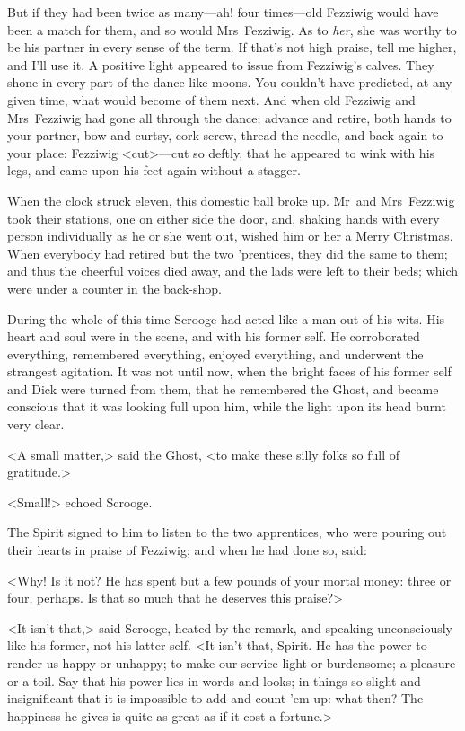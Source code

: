 But if they had been twice as many—ah! four times—old Fezziwig would have been a match for them, and so would Mrs~Fezziwig. As to \textit{her}, she was worthy to be his partner in every sense of the term. If that's not high praise, tell me higher, and I'll use it. A positive light appeared to issue from Fezziwig's calves. They shone in every part of the dance like moons. You couldn't have predicted, at any given time, what would become of them next. And when old Fezziwig and Mrs~Fezziwig had gone all through the dance; advance and retire, both hands to your partner, bow and curtsy, cork-screw, thread-the-needle, and back again to your place: Fezziwig <cut>—cut so deftly, that he appeared to wink with his legs, and came upon his feet again without a stagger.

When the clock struck eleven, this domestic ball broke up. Mr~and Mrs~Fezziwig took their stations, one on either side the door, and, shaking hands with every person individually as he or she went out, wished him or her a Merry Christmas. When everybody had retired but the two 'prentices, they did the same to them; and thus the cheerful voices died away, and the lads were left to their beds; which were under a counter in the back-shop.

During the whole of this time Scrooge had acted like a man out of his wits. His heart and soul were in the scene, and with his former self. He corroborated everything, remembered everything, enjoyed everything, and underwent the strangest agitation. It was not until now, when the bright faces of his former self and Dick were turned from them, that he remembered the Ghost, and became conscious that it was looking full upon him, while the light upon its head burnt very clear.

<A small matter,> said the Ghost, <to make these silly folks so full of gratitude.>

<Small!> echoed Scrooge.

The Spirit signed to him to listen to the two apprentices, who were pouring out their hearts in praise of Fezziwig; and when he had done so, said:

<Why! Is it not? He has spent but a few pounds of your mortal money: three or four, perhaps. Is that so much that he deserves this praise?>

<It isn't that,> said Scrooge, heated by the remark, and speaking unconsciously like his former, not his latter self. <It isn't that, Spirit. He has the power to render us happy or unhappy; to make our service light or burdensome; a pleasure or a toil. Say that his power lies in words and looks; in things so slight and insignificant that it is impossible to add and count 'em up: what then? The happiness he gives is quite as great as if it cost a fortune.>

